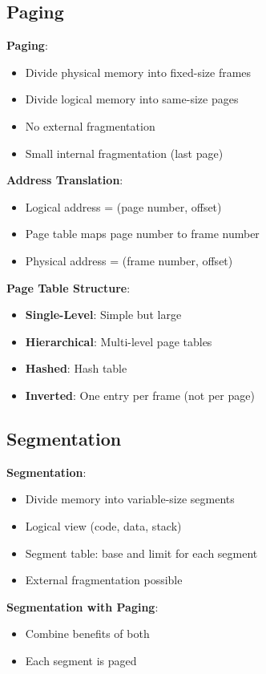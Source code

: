 \documentclass[12pt,a4paper]{report}
\begin{document}
\subsection{Paging}
\begin{concept}
\textbf{Paging}:
\begin{itemize}
    \item Divide physical memory into fixed-size frames
    \item Divide logical memory into same-size pages
    \item No external fragmentation
    \item Small internal fragmentation (last page)
\end{itemize}

\textbf{Address Translation}:
\begin{itemize}
    \item Logical address = (page number, offset)
    \item Page table maps page number to frame number
    \item Physical address = (frame number, offset)
\end{itemize}

\textbf{Page Table Structure}:
\begin{itemize}
    \item \textbf{Single-Level}: Simple but large
    \item \textbf{Hierarchical}: Multi-level page tables
    \item \textbf{Hashed}: Hash table
    \item \textbf{Inverted}: One entry per frame (not per page)
\end{itemize}
\end{concept}

\subsection{Segmentation}
\begin{concept}
\textbf{Segmentation}:
\begin{itemize}
    \item Divide memory into variable-size segments
    \item Logical view (code, data, stack)
    \item Segment table: base and limit for each segment
    \item External fragmentation possible
\end{itemize}

\textbf{Segmentation with Paging}:
\begin{itemize}
    \item Combine benefits of both
    \item Each segment is paged
\end{itemize}
\end{concept}
\end{document}
